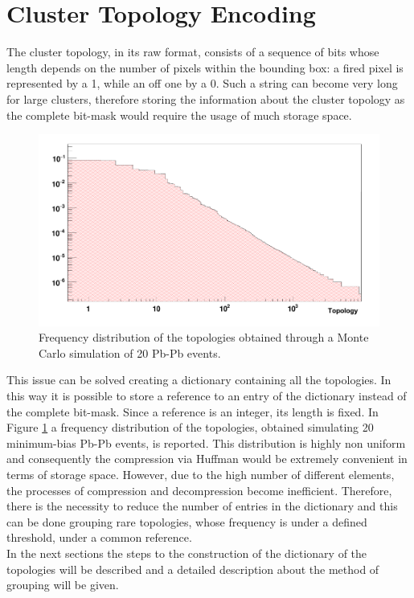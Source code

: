 \section{Cluster Topology Encoding}
The cluster topology, in its raw format, consists of a sequence of bits whose length depends on the number of pixels within the bounding box: a fired pixel is represented by a 1, while an off one by a 0. Such a string can become very long for large clusters, therefore storing the information about the cluster topology as the complete bit-mask would require the usage of much storage space.
%
\begin{figure}
  \centering
  \includegraphics[scale=0.4]{figures/topdistro.png}
  \caption{Frequency distribution of the topologies obtained through a Monte Carlo simulation of 20 Pb-Pb events.}
  \label{fig:topdistro}
\end{figure}
%
This issue can be solved creating a dictionary containing all the topologies. In this way it is possible to store a reference to an entry of the dictionary instead of the complete bit-mask. Since a reference is an integer, its length is fixed. In Figure \ref{fig:topdistro} a frequency distribution of the topologies, obtained simulating 20 minimum-bias Pb-Pb events, is reported. This distribution is highly non uniform and consequently the compression via Huffman would be extremely convenient in terms of storage space. However, due to the high number of different elements, the processes of compression and decompression become inefficient. Therefore, there is the necessity to reduce the number of entries in the dictionary and this can be done grouping rare topologies, whose frequency is under a defined threshold, under a common reference.\\
In the next sections the steps to the construction of the dictionary of the topologies will be described and a detailed description about the method of grouping will be given.
